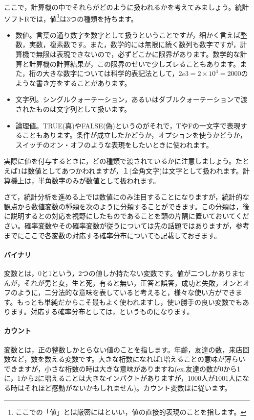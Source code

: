 \documentclass{ltjsbook}
\begin{document}
ここで，計算機の中でそれらがどのように扱われるかを考えてみましょう。統計ソフトRでは，値\footnote{ここでの「値」とは厳密にはといい，値の直接的表現のことを指します。}は3つの種類を持ちます。
\begin{itemize}
    \item 数値。言葉の通り数字を数字として扱うということですが，細かく言えば整数，実数，複素数です。また，数学的には無限に続く数列も数字ですが，計算機で無限は表現できないので，必ずどこかに限界があります。数学的な計算と計算機の計算結果が，この限界のせいで少しズレることもあります。また，桁の大きな数字については科学的表記法として，$2e3=2 \times 10^3 = 2000$のような書き方をすることがあります。
    \item 文字列。シングルクォーテーション，あるいはダブルクォーテーションで渡されたものは文字列として扱います。
    \item 論理値。TRUE(真)やFALSE(偽)というのがそれで，TやFの一文字で表現することもあります。条件が成立したかどうか，オプションを使うかどうか，スイッチのオン・オフのような表現をしたいときに使われます。
\end{itemize}
実際に値を付与するときに，どの種類で渡されているかに注意しましょう。たとえば$1$は数値としてあつかわれますが，１(全角文字)は文字として扱われます。計算機上は，半角数字のみが数値として扱われます。

さて，統計分析を進める上では数値にのみ注目することになりますが，統計的な観点から数値変数の種類を次のように分類することができます。この分類は，後に説明するとの対応を視野にしたものであることを頭の片隅に置いておいてください。確率変数やその確率変数が従うについては先の話題ではありますが，参考までにここで各変数の対応する確率分布についても記載しておきます。

\paragraph{バイナリ}
変数とは，0と1という，2つの値しか持たない変数です。値が二つしかありませんが，それが男と女，生と死，有ると無い，正答と誤答，成功と失敗，オンとオフのように，二分法的な意味を表していると考えると，様々な使い方ができます。もっとも単純だからこそ最もよく使われますし，使い勝手の良い変数でもあります。対応する確率分布としては，というものになります。
\paragraph{カウント}
変数とは，正の整数しかとらない値のことを指します。年齢，友達の数，来店回数など，数を数える変数です。大きな桁数になれば1増えることの意味が薄らいできますが，小さな桁数の時は大きな意味がありますね(ex.友達の数が0から1に，1から2に増えることは大きなインパクトがありますが，1000人が1001人になる時はそれほど感動がないかもしれません)。カウント変数はに従います。
\end{document}
